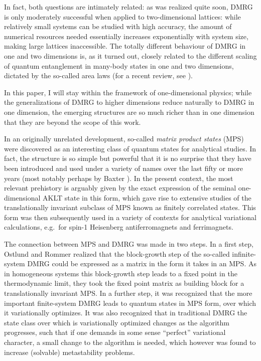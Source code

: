 \documentclass[a4paper,10pt,oneside,onecolumn,1p,times]{elsarticle}
\begin{document}
In fact, both questions are intimately related: as was realized quite soon, DMRG  is only moderately successful when applied to two-dimensional lattices: while relatively small systems can be studied with high accuracy\cite{White96,White98a,White98b,White00,White03,Chernyshev03,Chernyshev05,White07}, the amount of numerical resources needed essentially increases exponentially with system size, making large lattices inaccessible. The totally different behaviour of DMRG in one and two dimensions is, as it turned out, closely related\cite{Vidal03,Latorre04} to the different scaling of quantum entanglement in many-body states in one and two dimensions, dictated by the so-called area laws (for a recent review, see \cite{Eisert10}). 

In this paper, I will stay within the framework of one-dimensional physics; while the generalizations of DMRG to higher dimensions reduce naturally to DMRG in one dimension, the emerging structures are so much richer than in one dimension that they are beyond the scope of this work.  
  
In an originally unrelated development, so-called {\em matrix product states} (MPS) were discovered as an interesting class of quantum states for analytical studies. In fact, the structure is so simple but powerful that it is no surprise that they have been introduced and used under a variety of names over the last fifty or more years (most notably perhaps by Baxter \cite{Baxter68}). In the present context, the most relevant prehistory is arguably given by the exact expression of the seminal one-dimensional AKLT state in this form\cite{Affleck87,Affleck88,Fannes89}, which gave rise to extensive studies of the translationally invariant subclass of MPS known as finitely correlated states\cite{Fannes92}. This form was then subsequently used in a variety of contexts for analytical variational calculations, e.g.\ for spin-1 Heisenberg antiferromagnets\cite{Klumper93,Kolezhuk96a,Kolezhuk96b,Kolezhuk98} and ferrimagnets\cite{Kolezhuk97,Kolezhuk99}.

The connection between MPS and DMRG was made in two steps. In a first step, Ostlund and Rommer \cite{Ostlund95} realized that the block-growth step of the so-called infinite-system DMRG could be expressed as a matrix in the form it takes in an MPS. As in homogeneous systems this block-growth step leads to a fixed point in the thermodynamic limit, they took the fixed point matrix as building block for a translationally invariant MPS. In a further step, it was recognized that the more important finite-system DMRG leads to quantum states in MPS form, over which it variationally optimizes\cite{Dukelsky98}. It was also recognized that in traditional DMRG the state class over which is variationally optimized changes as the algorithm progresses, such that if one demands in some sense ``perfect'' variational character, a small change to the algorithm is needed, which however was found to increase (solvable) metastability problems\cite{Takasaki99,White05}. 
\end{document}
